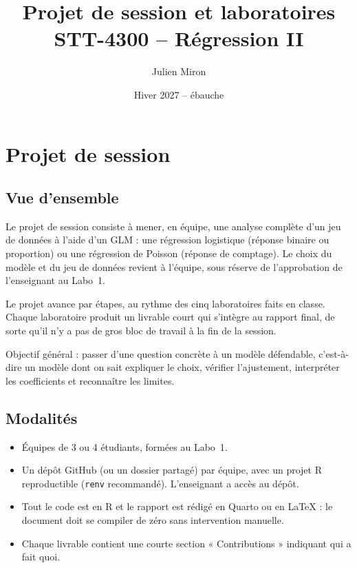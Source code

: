 \documentclass[11pt,letterpaper]{scrartcl}
\title{Projet de session et laboratoires\\\large STT-4300 -- Régression II}
\author{Julien Miron}
\date{Hiver 2027 -- ébauche}
\begin{document}
\maketitle
\tableofcontents
\bigskip

\section{Projet de session}

\subsection{Vue d'ensemble}

Le projet de session consiste à mener, en équipe, une analyse complète d'un jeu de données à l'aide d'un GLM : une régression logistique (réponse binaire ou proportion) ou une régression de Poisson (réponse de comptage). Le choix du modèle et du jeu de données revient à l'équipe, sous réserve de l'approbation de l'enseignant au Labo~1.

Le projet avance par étapes, au rythme des cinq laboratoires faits en classe. Chaque laboratoire produit un livrable court qui s'intègre au rapport final, de sorte qu'il n'y a pas de gros bloc de travail à la fin de la session.

\begin{envremarque}
Objectif général : passer d'une question concrète à un modèle défendable, c'est-à-dire un modèle dont on sait expliquer le choix, vérifier l'ajustement, interpréter les coefficients et reconnaître les limites.
\end{envremarque}

\subsection{Modalités}

\begin{itemize}
  \item Équipes de 3 ou 4 étudiants, formées au Labo~1.
  \item Un dépôt GitHub (ou un dossier partagé) par équipe, avec un projet R reproductible (\texttt{renv} recommandé). L'enseignant a accès au dépôt.
  \item Tout le code est en R et le rapport est rédigé en Quarto ou en \LaTeX{} : le document doit se compiler de zéro sans intervention manuelle.
  \item Chaque livrable contient une courte section « Contributions » indiquant qui a fait quoi.
\end{itemize}
\end{document}
